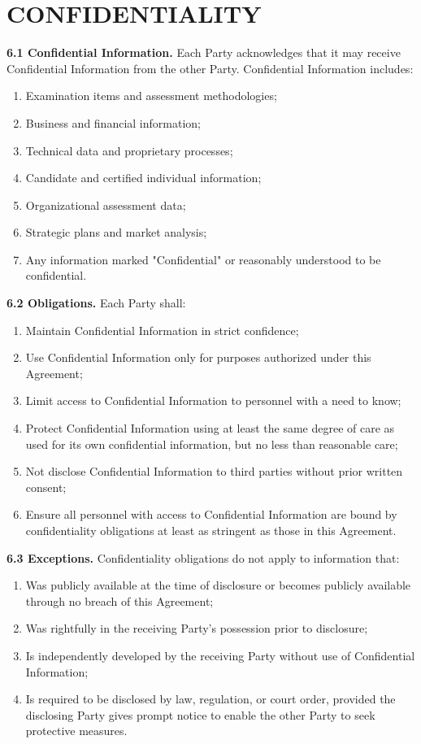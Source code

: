 \documentclass[11pt,a4paper]{article}
\begin{document}
\section{CONFIDENTIALITY}

\textbf{6.1 Confidential Information.} Each Party acknowledges that it may receive Confidential Information from the other Party. Confidential Information includes:

\begin{enumerate}[label=\alph*)]
\item Examination items and assessment methodologies;
\item Business and financial information;
\item Technical data and proprietary processes;
\item Candidate and certified individual information;
\item Organizational assessment data;
\item Strategic plans and market analysis;
\item Any information marked "Confidential" or reasonably understood to be confidential.
\end{enumerate}

\textbf{6.2 Obligations.} Each Party shall:

\begin{enumerate}[label=\alph*)]
\item Maintain Confidential Information in strict confidence;
\item Use Confidential Information only for purposes authorized under this Agreement;
\item Limit access to Confidential Information to personnel with a need to know;
\item Protect Confidential Information using at least the same degree of care as used for its own confidential information, but no less than reasonable care;
\item Not disclose Confidential Information to third parties without prior written consent;
\item Ensure all personnel with access to Confidential Information are bound by confidentiality obligations at least as stringent as those in this Agreement.
\end{enumerate}

\textbf{6.3 Exceptions.} Confidentiality obligations do not apply to information that:

\begin{enumerate}[label=\alph*)]
\item Was publicly available at the time of disclosure or becomes publicly available through no breach of this Agreement;
\item Was rightfully in the receiving Party's possession prior to disclosure;
\item Is independently developed by the receiving Party without use of Confidential Information;
\item Is required to be disclosed by law, regulation, or court order, provided the disclosing Party gives prompt notice to enable the other Party to seek protective measures.
\end{enumerate}
\end{document}
